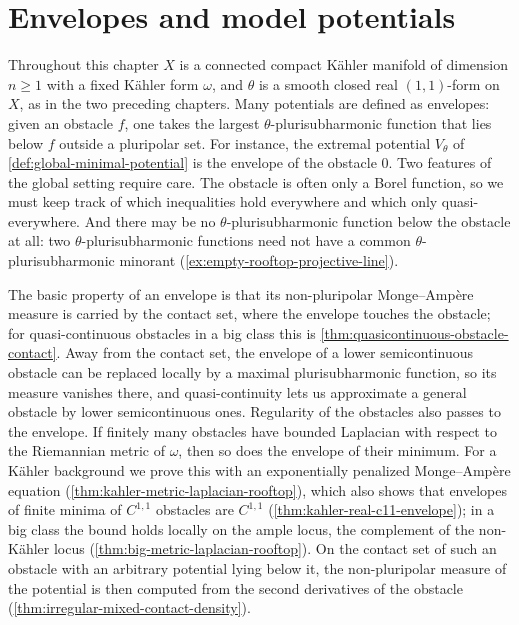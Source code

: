 \chapter{Envelopes and model potentials}
\label{chap:q10}

Throughout this chapter $X$ is a connected compact K\"ahler manifold of dimension $n\geq1$ with a fixed K\"ahler form $\omega$, and $\theta$ is a smooth closed real $(1,1)$-form on $X$, as in the two preceding chapters. Many potentials are defined as envelopes: given an obstacle $f$, one takes the largest $\theta$-plurisubharmonic function that lies below $f$ outside a pluripolar set. For instance, the extremal potential $V_\theta$ of \cref{def:global-minimal-potential} is the envelope of the obstacle $0$. Two features of the global setting require care. The obstacle is often only a Borel function, so we must keep track of which inequalities hold everywhere and which only quasi-everywhere. And there may be no $\theta$-plurisubharmonic function below the obstacle at all: two $\theta$-plurisubharmonic functions need not have a common $\theta$-plurisubharmonic minorant (\cref{ex:empty-rooftop-projective-line}).

The basic property of an envelope is that its non-pluripolar Monge--Amp\`ere measure is carried by the contact set, where the envelope touches the obstacle; for quasi-continuous obstacles in a big class this is \cref{thm:quasicontinuous-obstacle-contact}. Away from the contact set, the envelope of a lower semicontinuous obstacle can be replaced locally by a maximal plurisubharmonic function, so its measure vanishes there, and quasi-continuity lets us approximate a general obstacle by lower semicontinuous ones. Regularity of the obstacles also passes to the envelope. If finitely many obstacles have bounded Laplacian with respect to the Riemannian metric of $\omega$, then so does the envelope of their minimum. For a K\"ahler background we prove this with an exponentially penalized Monge--Amp\`ere equation (\cref{thm:kahler-metric-laplacian-rooftop}), which also shows that envelopes of finite minima of $C^{1,1}$ obstacles are $C^{1,1}$ (\cref{thm:kahler-real-c11-envelope}); in a big class the bound holds locally on the ample locus, the complement of the non-K\"ahler locus (\cref{thm:big-metric-laplacian-rooftop}). On the contact set of such an obstacle with an arbitrary potential lying below it, the non-pluripolar measure of the potential is then computed from the second derivatives of the obstacle (\cref{thm:irregular-mixed-contact-density}).

